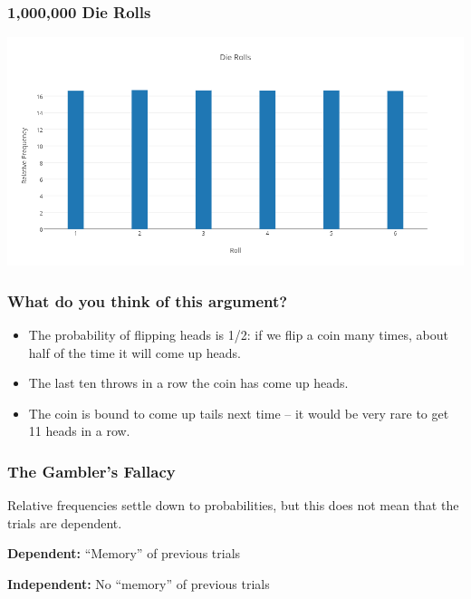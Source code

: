 \documentclass{beamer}
\begin{document}
\begin{frame}
\frametitle{1,000,000 Die Rolls}
	\centering
	\includegraphics[scale = 0.3]{./images/die4.png}
\end{frame}

\begin{frame}
\frametitle{What do you think of this argument?}
	\begin{itemize}
		\item The probability of flipping heads is 1/2: if we flip a coin many times, about half of the 
		time it will come up heads.
		\item The last ten throws in a row the coin has come up heads.
		\item The coin is bound to come up tails next time -- it would be very rare to get 11 heads in a 
		row.
	\end{itemize}
\end{frame}

\begin{frame}
\frametitle{The Gambler's Fallacy}
	\alert{Relative frequencies settle down to probabilities, but this does not mean that the trials are 
	dependent.}
	
    \textbf{Dependent:} ``Memory'' of previous trials

	\textbf{Independent:} No ``memory'' of previous trials
\end{frame}
\end{document}
